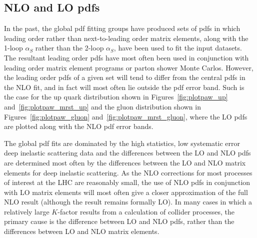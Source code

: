 \documentclass[12pt]{iopart}
\def\as{\alpha_S}
\begin{document}
%

\subsection{NLO and LO pdfs}
\label{sec:nlolopdfs}

In the past, the global pdf fitting groups have produced sets of pdfs in which leading order rather than  next-to-leading order
matrix elements, along with the 1-loop $\as$ rather than the 2-loop $\as$, have been used to fit  the input datasets.
The resultant leading order pdfs have most often  been used in conjunction  with leading  order matrix element programs or
parton shower Monte Carlos. However, the leading order pdfs of a given  set will tend to differ  from the central pdfs 
in the NLO fit, and in fact will most often lie outside the pdf error band.  Such is the case for the up quark distribution shown
in Figures~\ref{fig:plotpaw_up} and~\ref{fig:plotpaw_mrst_up} and the gluon distribution shown in
Figures~\ref{fig:plotpaw_gluon} and~\ref{fig:plotpaw_mrst_gluon},  where the LO pdfs are plotted along with the NLO pdf error
bands. 

\setcounter{footnote}{0}

The global pdf fits are dominated by the high statistics, low systematic error deep inelastic scattering data and the differences
between the LO and NLO pdfs are determined most often by the differences between the LO and NLO matrix elements for deep
inelastic scattering. As the NLO corrections for most processes of interest at the LHC are reasonably small, the use of NLO
pdfs in conjunction with LO matrix elements will most often give a closer approximation of the full NLO result (although the
result remains formally LO). 
In many cases in which a relatively large $K$-factor results from a calculation of collider processes, the primary cause
is the difference between LO and NLO pdfs, rather than the differences between LO and NLO matrix elements. 
\end{document}

